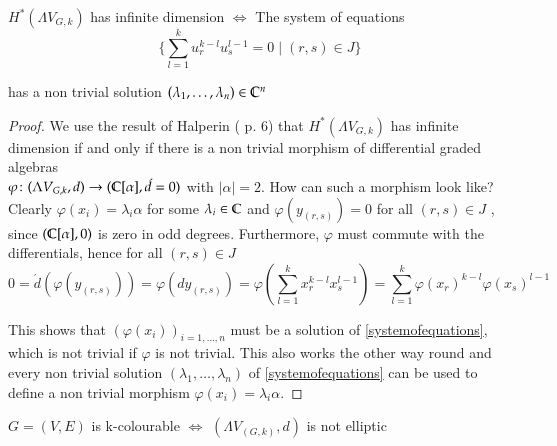  
\begin{Lemma}
\label{lma:cohomoly+equations}
 $H^*(\Lambda V_{G,k})$ has infinite dimension $\iff$ The system of equations \\
 \begin{equation}
 \label{systemofequations}
 {\lbrace \sum_{l = 1}^k u_r^{k - l} u_s^{l - 1} = 0 \; | \; (r,s) \in J \rbrace}  
 \end{equation}
 
 has a non trivial solution 
 $(\lambda_1 , \dotsc, \lambda_n) \in \mathbb{C}^n$
\end{Lemma}

\begin{proof}
 We use the result of Halperin (\cite{Halperin1988} p. 6) that $H^*(\Lambda V_{G,k})$ has infinite dimension if and only if %
 there is a non trivial morphism of differential graded algebras \\
 ${\varphi \colon (\Lambda V_{G,k},d) \to ( \mathbb{C} [\alpha] ,\acute{d} = 0)}$ with $|\alpha| = 2$. How can such a morphism look like?
 Clearly $\varphi(x_i) = \lambda_i \alpha$ for some $\lambda_i \in \mathbb{C}$ and $\varphi(y_{(r,s)}) = 0$ for all $(r,s) \in J$ , since 
 $(\mathbb{C} [\alpha] , 0)$ is zero in odd degrees. Furthermore, $\varphi$ must commute with the differentials, hence 
 for all $(r,s) \in J$
 $$ 0 = \acute{d} (\varphi(y_{(r,s)})) = \varphi(dy_{(r,s)}) = \varphi(\sum_{l = 1}^k x_r^{k -l} x_s^{l - 1})
 = \sum_{l = 1}^k \varphi(x_r)^{k -l} \varphi(x_s)^{l - 1}$$
 
 This shows that $(\varphi(x_i))_{i = 1, \dotsc , n}$ must be a solution of \ref{systemofequations}, which is not trivial
 if $\varphi$ is not trivial.
 This also works the other way round and every non trivial solution  $(\lambda_1 , \dotsc, \lambda_n)$ of \ref{systemofequations}
 can be used to define a non trivial morphism $\varphi(x_i) = \lambda_i \alpha$.
 \end{proof}

 \begin{Theorem}
   $G = (V,E)$ is k-colourable $\iff$ $(\Lambda V_{(G,k)},d)$ is not elliptic
 \end{Theorem}

